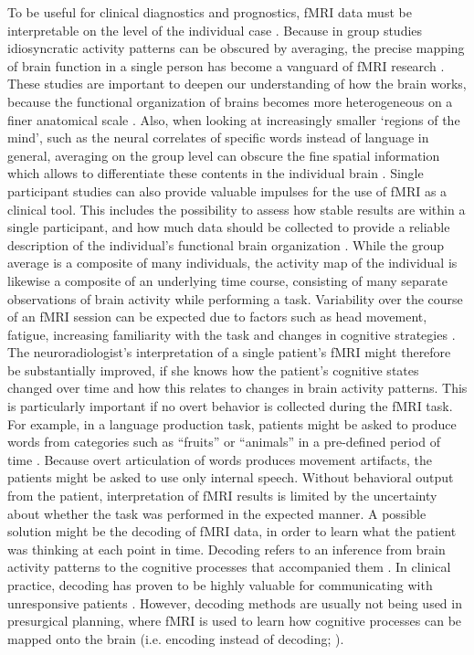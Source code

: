 \documentclass[fleqn,10pt]{SelfArx} %
\begin{document}
To be useful for clinical diagnostics and prognostics, fMRI data must be interpretable on the level of the individual case \citep{Dubois_2016}. Because in group studies idiosyncratic activity patterns can be obscured by averaging, the precise mapping of brain function in a single person has become a vanguard of fMRI research \citep{Laumann_2015, Huth_2016, Gordon_2017}. These studies are important to deepen our understanding of how the brain works, because the functional organization of brains becomes more heterogeneous on a finer anatomical scale \citep{Laumann_2015, Poldrack_2017}. Also, when looking at increasingly smaller ‘regions of the mind’, such as the neural correlates of specific words instead of language in general, averaging on the group level can obscure the fine spatial information which allows to differentiate these contents in the individual brain \citep{Huth_2016}. Single participant studies can also provide valuable impulses for the use of fMRI as a clinical tool. This includes the possibility to assess how stable results are within a single participant, and how much data should be collected to provide a reliable description of the individual's functional brain organization \citep{Laumann_2015,Gordon_2017}. While the group average is a composite of many individuals, the activity map of the individual is likewise a composite of an underlying time course, consisting of many separate observations of brain activity while performing a task. Variability over the course of an fMRI session can be expected due to factors such as head movement, fatigue, increasing familiarity with the task and changes in cognitive strategies \citep{McGonigle_2012,Gorgolewski_2013}. The neuroradiologist's interpretation of a single patient's fMRI might therefore be substantially improved, if she knows how the patient's cognitive states changed over time and how this relates to changes in brain activity patterns. This is particularly important if no overt behavior is collected during the fMRI task. For example, in a language production task, patients might be asked to produce words from categories such as “fruits” or “animals” in a pre-defined period of time \citep{Woermann_2003}. Because overt articulation of words produces movement artifacts, the patients might be asked to use only internal speech. Without behavioral output from the patient, interpretation of fMRI results is limited by the uncertainty about whether the task was performed in the expected manner.
A possible solution might be the decoding of fMRI data, in order to learn what the patient was thinking at each point in time. Decoding refers to an inference from brain activity patterns to the cognitive processes that accompanied them \citep{Poldrack_2006,Haynes_2006}. In clinical practice, decoding has proven to be highly valuable for communicating with unresponsive patients \citep{Owen_2006,Boly_2007,Sorger_2012}. However, decoding methods are usually not being used in presurgical planning, where fMRI is used to learn how cognitive processes can be mapped onto the brain (i.e. encoding instead of decoding; \citet{Naselaris_2011}).
\end{document}
